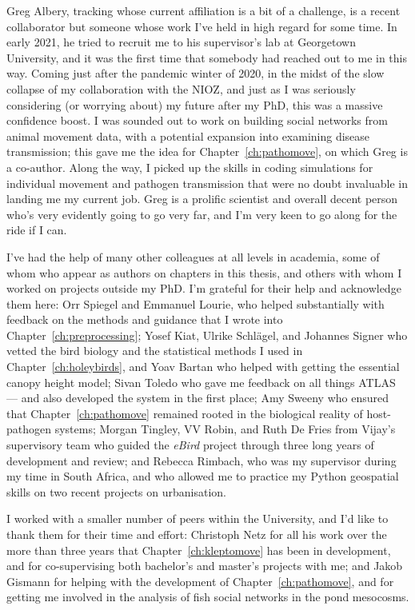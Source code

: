 \noindent Greg Albery, tracking whose current affiliation is a bit of a challenge, is a recent collaborator but someone whose work I've held in high regard for some time.
In early 2021, he tried to recruit me to his supervisor's lab at Georgetown University, and it was the first time that somebody had reached out to me in this way. 
Coming just after the pandemic winter of 2020, in the midst of the slow collapse of my collaboration with the NIOZ, and just as I was seriously considering (or worrying about) my future after my PhD, this was a massive confidence boost.
I was sounded out to work on building social networks from animal movement data, with a potential expansion into examining disease transmission; this gave me the idea for Chapter~\ref{ch:pathomove}, on which Greg is a co-author.
Along the way, I picked up the skills in coding simulations for individual movement and pathogen transmission that were no doubt invaluable in landing me my current job.
Greg is a prolific scientist and overall decent person who's very evidently going to go very far, and I'm very keen to go along for the ride if I can.

\noindent I've had the help of many other colleagues at all levels in academia, some of whom who appear as authors on chapters in this thesis, and others with whom I worked on projects outside my PhD.
I'm grateful for their help and acknowledge them here:
Orr Spiegel and Emmanuel Lourie, who helped substantially with feedback on the methods and guidance that I wrote into Chapter~\ref{ch:preprocessing};
Yosef Kiat, Ulrike Schl{\"a}gel, and Johannes Signer who vetted the bird biology and the statistical methods I used in Chapter~\ref{ch:holeybirds}, and Yoav Bartan who helped with getting the essential canopy height model;
Sivan Toledo who gave me feedback on all things ATLAS --- and also developed the system in the first place;
Amy Sweeny who ensured that Chapter~\ref{ch:pathomove} remained rooted in the biological reality of host-pathogen systems;
Morgan Tingley, VV Robin, and Ruth De Fries from Vijay's supervisory team who guided the \textit{eBird} project through three long years of development and review;
and Rebecca Rimbach, who was my supervisor during my time in South Africa, and who allowed me to practice my Python geospatial skills on two recent projects on urbanisation.

I worked with a smaller number of peers within the University, and I'd like to thank them for their time and effort:
Christoph Netz for all his work over the more than three years that Chapter~\ref{ch:kleptomove} has been in development, and for co-supervising both bachelor's and master's projects with me;
and Jakob Gismann for helping with the development of Chapter~\ref{ch:pathomove}, and for getting me involved in the analysis of fish social networks in the pond mesocosms.

